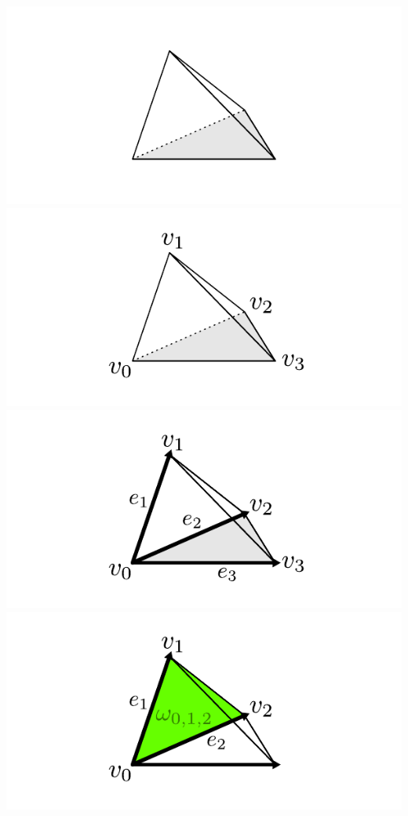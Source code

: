 \documentclass[compress]{beamer}
\begin{document}
\begin{frame}
  \begin{center}
    \begin{overprint}
      \includegraphics[scale=1.0]{../img/conditions/01.pdf}
      \includegraphics[scale=1.0]{../img/conditions/02.pdf}
      \includegraphics[scale=1.0]{../img/conditions/03.pdf}
      \includegraphics[scale=1.0]{../img/conditions/04.pdf}

\end{overprint}
\end{center}
\end{frame}
\end{document}

